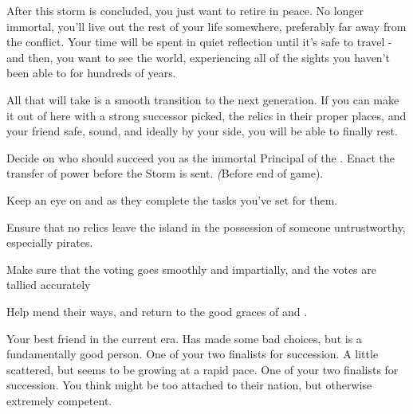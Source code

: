\documentclass[char]{GL2020}
\begin{document}
After this storm is concluded, you just want to retire in peace. No longer immortal, you’ll live out the rest of your life somewhere, preferably far away from the conflict. Your time will be spent in quiet reflection until it’s safe to travel - and then, you want to see the world, experiencing all of the sights you haven’t been able to for hundreds of years.

All that will take is a smooth transition to the next generation. If you can make it out of here with a strong successor picked, the relics in their proper places, and your friend \cChupAvenger{} safe, sound, and ideally by your side, you will be able to finally rest.

\begin{itemz}[Goals]
	\item Decide on who should succeed you as the immortal Principal of the \pSchool{}. Enact the transfer of power before the Storm is sent. \emph(Before end of game).
	\item Keep an eye on \cMusic{} and \cBeetle{} as they complete the tasks you’ve set for them.
	\item Ensure that no relics leave the island in the possession of someone untrustworthy, especially pirates.
	\item Make sure that the voting goes smoothly and impartially, and the votes are tallied accurately
	\item Help \cChupAvenger{} mend their ways, and return to the good graces of \cEbb{} and \cFlow{}.
\end{itemz}

\begin{itemz}[Notes]
	\item 
\end{itemz}

\begin{contacts}
	\contact{\cChupAvenger{}} Your best friend in the current era. Has made some bad choices, but is a fundamentally good person.
	\contact{\cMusic{}} One of your two finalists for succession. A little scattered, but seems to be growing at a rapid pace.
	\contact{\cBeetle{}} One of your two finalists for succession. You think \cBeetle{\they} might be too attached to their nation, but \cBeetle{\theyare} otherwise extremely competent.
\end{contacts}
\end{document}
